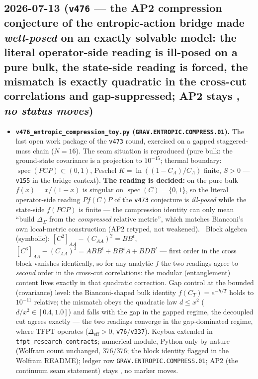 \subsection*{2026-07-13 (\texttt{v476} --- the AP2 compression conjecture of the entropic-action bridge made \emph{well-posed} on an exactly solvable model: the literal operator-side reading is ill-posed on a pure bulk, the state-side reading is forced, the mismatch is exactly quadratic in the cross-cut correlations and gap-suppressed; AP2 stays \mO, \emph{no status moves})}
\begin{itemize}[leftmargin=1.5em]
\item \textbf{\texttt{v476\_entropic\_compression\_toy.py} (\texttt{GRAV.ENTROPIC.COMPRESS.01}).} The last
open work package of the \texttt{v473} round, exercised on a gapped staggered-mass chain ($N{=}16$).
The seam situation is reproduced (pure bulk: the ground-state covariance is a projection to $10^{-15}$;
thermal boundary: $\operatorname{spec}(PCP)\subset(0,1)$, Peschel $K{=}\ln((1{-}C_A)/C_A)$ finite,
$S{>}0$ --- \texttt{v155} in the bridge context). \textbf{The reading is decided:} on the pure bulk
$f(x){=}x/(1{-}x)$ is singular on $\operatorname{spec}(C){=}\{0,1\}$, so the literal operator-side
reading $P f(C) P$ of the \texttt{v473} conjecture is \emph{ill-posed} while the state-side $f(PCP)$ is
finite --- the compression identity can only mean ``build $\Delta_\Sigma$ from the \emph{compressed}
relative metric'', which matches Bianconi's own local-metric construction (AP2 retyped, not weakened).
\mE\ Block algebra (symbolic): $[C^2]_{AA}{-}(C_{AA})^2{=}BB^t$, $[C^3]_{AA}{-}(C_{AA})^3{=}ABB^t{+}
BB^tA{+}BDB^t$ --- first order in the cross block vanishes identically, so for any analytic $f$ the two
readings agree to \emph{second} order in the cross-cut correlations: the modular (entanglement) content
lives exactly in that quadratic correction. Gap control at the bounded (covariance) level: the
Bianconi-shaped bulk identity $f(C_T){=}e^{-h/T}$ holds to $10^{-11}$ relative; the mismatch obeys the
quadratic law $d\le x^2$ ($d/x^2\in[0.4,1.0]$) and falls with the gap in the gapped regime, the
decoupled cut agrees exactly --- the two readings converge in the gap-dominated regime, where TFPT
operates ($\Delta_{\mathrm{eff}}{>}0$, \texttt{v76}/\texttt{v337}). Keybox extended in
\texttt{tfpt\_research\_contracts}; numerical module, Python-only by nature (Wolfram count unchanged,
$376/376$; the block identity flagged in the Wolfram README); ledger row
\texttt{GRAV.ENTROPIC.COMPRESS.01}; AP2 (the continuum seam statement) stays \mO, no marker moves.
\end{itemize}

